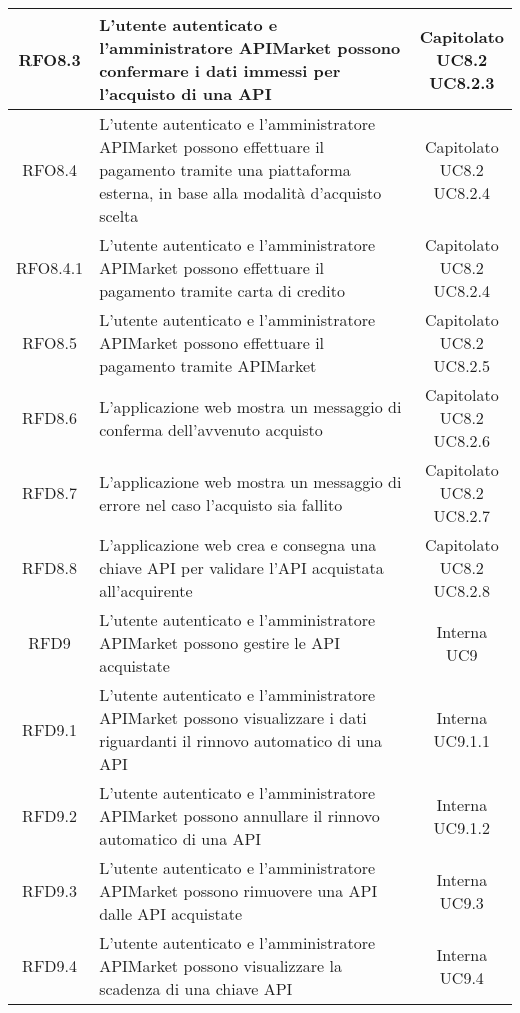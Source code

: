 \begin{longtable}{|c|m{8cm}|c|}
RFO8.3 & L'utente autenticato e l'amministratore APIMarket possono confermare i dati immessi per l'acquisto di una API & \makecell*{Capitolato\\UC8.2\\UC8.2.3} \\
\hline
RFO8.4 & L'utente autenticato e l'amministratore APIMarket possono effettuare il pagamento tramite una piattaforma esterna, in base alla modalità d'acquisto scelta & \makecell*{Capitolato\\UC8.2\\UC8.2.4} \\
\hline

RFO8.4.1 & L'utente autenticato e l'amministratore APIMarket possono effettuare il pagamento tramite carta di credito & \makecell*{Capitolato\\UC8.2\\UC8.2.4} \\
\hline

RFO8.5 & L'utente autenticato e l'amministratore APIMarket possono effettuare il pagamento tramite APIMarket & \makecell*{Capitolato\\UC8.2\\UC8.2.5} \\
\hline
RFD8.6 & L'applicazione web mostra un messaggio di conferma dell'avvenuto acquisto & \makecell*{Capitolato\\UC8.2\\UC8.2.6} \\
\hline
RFD8.7 & L'applicazione web mostra un messaggio di errore nel caso l'acquisto sia fallito & \makecell*{Capitolato\\UC8.2\\UC8.2.7} \\
\hline
RFD8.8 & L'applicazione web crea e consegna una chiave API per validare l'API acquistata all'acquirente & \makecell*{Capitolato\\UC8.2\\UC8.2.8} \\
\hline

RFD9 & L'utente autenticato e l'amministratore APIMarket possono gestire le API acquistate & \makecell*{Interna\\UC9} \\
\hline

RFD9.1 & L'utente autenticato e l'amministratore APIMarket possono visualizzare i dati riguardanti il rinnovo automatico di una API & \makecell*{Interna\\UC9.1.1} \\
\hline
RFD9.2 & L'utente autenticato e l'amministratore APIMarket possono annullare il rinnovo automatico di una API & \makecell*{Interna\\UC9.1.2} \\
\hline
RFD9.3 & L'utente autenticato e l'amministratore APIMarket possono rimuovere una API dalle API acquistate & \makecell*{Interna\\UC9.3} \\
\hline
RFD9.4 & L'utente autenticato e l'amministratore APIMarket possono visualizzare la scadenza di una chiave API & \makecell*{Interna\\UC9.4} \\
\hline


\end{longtable}
